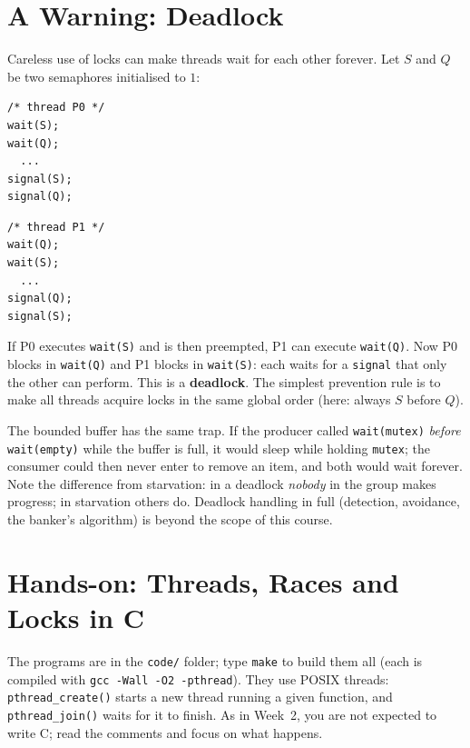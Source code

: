 \documentclass[11pt,a4paper]{article}
\newcommand{\term}[1]{\textbf{\color{mintdeep}#1}}
\newcommand{\cmd}[1]{\texttt{#1}}
\begin{document}
\section{A Warning: Deadlock}

Careless use of locks can make threads wait for each other forever. Let $S$ and $Q$ be two semaphores initialised to $1$:

\begin{center}
\begin{minipage}[t]{0.3\linewidth}
\begin{lstlisting}[numbers=none]
/* thread P0 */
wait(S);
wait(Q);
  ...
signal(S);
signal(Q);
\end{lstlisting}
\end{minipage}\qquad
\begin{minipage}[t]{0.3\linewidth}
\begin{lstlisting}[numbers=none]
/* thread P1 */
wait(Q);
wait(S);
  ...
signal(Q);
signal(S);
\end{lstlisting}
\end{minipage}
\end{center}

If P0 executes \texttt{wait(S)} and is then preempted, P1 can execute \texttt{wait(Q)}. Now P0 blocks in \texttt{wait(Q)} and P1 blocks in \texttt{wait(S)}: each waits for a \texttt{signal} that only the other can perform. This is a \term{deadlock}. The simplest prevention rule is to make all threads acquire locks in the same global order (here: always $S$ before $Q$).

The bounded buffer has the same trap. If the producer called \texttt{wait(mutex)} \emph{before} \texttt{wait(empty)} while the buffer is full, it would sleep while holding \texttt{mutex}; the consumer could then never enter to remove an item, and both would wait forever. Note the difference from starvation: in a deadlock \emph{nobody} in the group makes progress; in starvation others do. Deadlock handling in full (detection, avoidance, the banker's algorithm) is beyond the scope of this course.

\section{Hands-on: Threads, Races and Locks in C}

The programs are in the \texttt{code/} folder; type \cmd{make} to build them all (each is compiled with \cmd{gcc -Wall -O2 -pthread}). They use POSIX threads: \cmd{pthread\_create()} starts a new thread running a given function, and \cmd{pthread\_join()} waits for it to finish. As in Week~2, you are not expected to write C; read the comments and focus on what happens.
\end{document}
